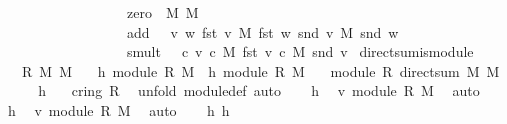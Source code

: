 \begin{isabellebody}
\ \ \ \ \ \ \ \ \ \ \ \ \ \ \ \ \ \ zero\ {\isacharequal}\ {\isacharparenleft}{\isasymzero}\isactrlbsub M{}\isactrlesub {\isacharcomma}\ {\isasymzero}\isactrlbsub M{}\isactrlesub {\isacharparenright}{\isacharcomma}\isanewline
\ \ \ \ \ \ \ \ \ \ \ \ \ \ \ \ \ \ add\ {\isacharequal}\ {\isacharparenleft}{\isasymlambda}\ v\ w{\isachardot}\ {\isacharparenleft}fst\ v\ {\isasymoplus}\isactrlbsub M{}\isactrlesub \ fst\ w{\isacharcomma}\ snd\ v\ {\isasymoplus}\isactrlbsub M{}\isactrlesub \ snd\ w{\isacharparenright}{\isacharparenright}{\isacharcomma}\isanewline
\ \ \ \ \ \ \ \ \ \ \ \ \ \ \ \ \ \ smult\ {\isacharequal}\ {\isacharparenleft}{\isasymlambda}\ c\ v{\isachardot}\ {\isacharparenleft}c\ {\isasymodot}\isactrlbsub M{}\isactrlesub \ fst\ v{\isacharcomma}\ c\ {\isasymodot}\isactrlbsub M{}\isactrlesub \ snd\ v{\isacharparenright}{\isacharparenright}{\isasymrparr}{\isachardoublequoteclose}\isanewline
\isanewline
{}\isamarkupfalse%
\ direct{\isacharunderscore}sum{\isacharunderscore}is{\isacharunderscore}module{\isacharcolon}\ \isanewline
\ \ \ R\ M{}\ M{}\isanewline
\ \ \ h{}{\isacharcolon}\ {\isachardoublequoteopen}module\ R\ M{}{\isachardoublequoteclose}\ \ h{}{\isacharcolon}\ {\isachardoublequoteopen}module\ R\ M{}{\isachardoublequoteclose}\isanewline
\ \ \ {\isachardoublequoteopen}module\ R\ {\isacharparenleft}direct{\isacharunderscore}sum\ M{}\ M{}{\isacharparenright}{\isachardoublequoteclose}\isanewline
%
\isadelimproof
%
\endisadelimproof
%
\isatagproof
{}\isamarkupfalse%
\ {\isacharminus}\isanewline
\ \ \isamarkupfalse%
\ h{}\ \isamarkupfalse%
\ {}{\isacharcolon}\ {\isachardoublequoteopen}cring\ R{\isachardoublequoteclose}\ \isamarkupfalse%
\ {\isacharparenleft}unfold\ module{\isacharunderscore}def{\isacharcomma}\ auto{\isacharparenright}\isanewline
\ \ \isamarkupfalse%
\ h{}\ \isamarkupfalse%
\ v{}{\isacharcolon}\ module\ R\ M{}\ \isamarkupfalse%
\ auto\isanewline
\ \ \isamarkupfalse%
\ h{}\ \isamarkupfalse%
\ v{}{\isacharcolon}\ module\ R\ M{}\ \isamarkupfalse%
\ auto\isanewline
\ \ \isamarkupfalse%
\ h{}\ h{}\ \isamarkupfalse%

\end{isabellebody}

